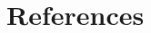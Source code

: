 \documentclass[final,3p,times,twocolumn,authoryear]{elsarticle}
\begin{document}
\section*{References}



 



\begin{thebibliography}{00}


\bibitem[ ()]{}

\end{thebibliography}
\end{document}
